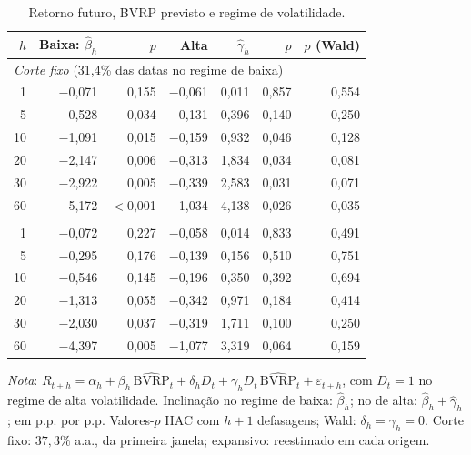 \begin{table}[H]
\centering
\small
\caption{Retorno futuro, BVRP previsto e regime de volatilidade.}
\label{tab:retlin-regime}
\begin{tabular}{rrrrrrr}
\toprule
$h$ & Baixa: $\hat\beta_h$ & $p$ & Alta & $\hat\gamma_h$ & $p$ & $p$ (Wald) \\
\midrule
\multicolumn{7}{l}{\textit{Corte fixo} (31{,}4\% das datas no regime de baixa)} \\
1 & $-$0{,}071 & 0{,}155 & $-$0{,}061 & 0{,}011 & 0{,}857 & 0{,}554 \\
5 & $-$0{,}528 & 0{,}034 & $-$0{,}131 & 0{,}396 & 0{,}140 & 0{,}250 \\
10 & $-$1{,}091 & 0{,}015 & $-$0{,}159 & 0{,}932 & 0{,}046 & 0{,}128 \\
20 & $-$2{,}147 & 0{,}006 & $-$0{,}313 & 1{,}834 & 0{,}034 & 0{,}081 \\
30 & $-$2{,}922 & 0{,}005 & $-$0{,}339 & 2{,}583 & 0{,}031 & 0{,}071 \\
60 & $-$5{,}172 & $<$0{,}001 & $-$1{,}034 & 4{,}138 & 0{,}026 & 0{,}035 \\
\addlinespace
\multicolumn{7}{l}{\textit{Corte expansivo} (25{,}1\% das datas no regime de baixa)} \\
1 & $-$0{,}072 & 0{,}227 & $-$0{,}058 & 0{,}014 & 0{,}833 & 0{,}491 \\
5 & $-$0{,}295 & 0{,}176 & $-$0{,}139 & 0{,}156 & 0{,}510 & 0{,}751 \\
10 & $-$0{,}546 & 0{,}145 & $-$0{,}196 & 0{,}350 & 0{,}392 & 0{,}694 \\
20 & $-$1{,}313 & 0{,}055 & $-$0{,}342 & 0{,}971 & 0{,}184 & 0{,}414 \\
30 & $-$2{,}030 & 0{,}037 & $-$0{,}319 & 1{,}711 & 0{,}100 & 0{,}250 \\
60 & $-$4{,}397 & 0{,}005 & $-$1{,}077 & 3{,}319 & 0{,}064 & 0{,}159 \\
\bottomrule
\end{tabular}
\par\smallskip
\parbox{0.95\linewidth}{\footnotesize\textit{Nota}: $R_{t+h} = \alpha_h + \beta_h\,\widehat{\text{BVRP}}_t + \delta_h D_t + \gamma_h D_t\,\widehat{\text{BVRP}}_t + \varepsilon_{t+h}$, com $D_t = 1$ no regime de alta volatilidade. Inclinação no regime de baixa: $\hat\beta_h$; no de alta: $\hat\beta_h + \hat\gamma_h$; em p.p. por p.p. Valores-$p$ HAC com $h+1$ defasagens; Wald: $\delta_h = \gamma_h = 0$. Corte fixo: $37{,}3\%$ a.a., da primeira janela; expansivo: reestimado em cada origem.}
\end{table}
